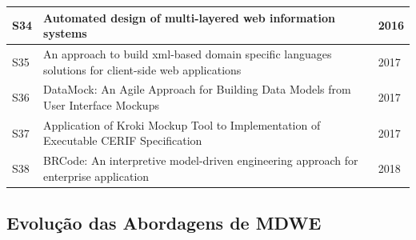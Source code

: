 \begin{table}[ht!]
\begin{tabular}{ | p{0.3cm} | p{6.2cm} | p{0.7cm}|}
S34 &  Automated design of multi-layered web information systems~\cite{Basso16JSS}  &  2016 \\ \hline

S35 &  An approach to build xml-based domain specific languages solutions for client-side web applications~\cite{chavarriaga2017approach}  & 2017 \\ \hline


S36 &  DataMock: An Agile Approach for Building Data Models from User Interface Mockups~\cite{Rivero2017}  & 2017 \\ \hline

S37 &  Application of Kroki Mockup Tool to Implementation of Executable CERIF Specification~\cite{FILIPOVIC2017245}  &  2017 \\ \hline

S38 &  BRCode: An interpretive model-driven engineering approach for enterprise application~\cite{OLIVEIRA201886}  &  2018 \\ \hline

\end{tabular}

\label{table:npapers} 
\end{table}







\subsection{Evolução das Abordagens de MDWE}

